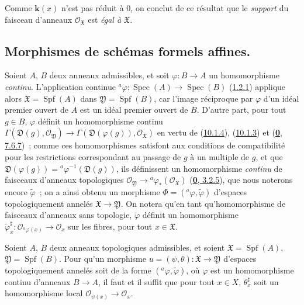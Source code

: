 Comme $\boldsymbol{k}(x)$ n'est pas réduit à 0, on conclut de ce résultat que le
\emph{support} du faisceau d'anneaux $\mathscr{O}_{\mathfrak{X}}$ est
\emph{égal à $\mathfrak{X}$}.

\subsection{Morphismes de schémas formels affines.}
\label{subsection:I.10.2-fr}

\begin{env}[10.2.1]
\label{I.10.2.1-fr}
Soient $A$, $B$ deux anneaux admissibles, et soit
$\varphi:B\to A$ un homomorphisme \emph{continu}. L'application continue
$ {}^a\varphi:\operatorname{Spec}(A)\to\operatorname{Spec}(B)$
(\hyperref[I.1.2.1-fr]{1.2.1}) applique alors
$\mathfrak{X}=\operatorname{Spf}(A)$ dans
$\mathfrak{Y}=\operatorname{Spf}(B)$, car l'image réciproque par
$\varphi$ d'un idéal premier ouvert de $A$ est un idéal premier ouvert de
$B$. D'autre part, pour tout $g\in B$, $\varphi$ définit un homomorphisme
continu
$\Gamma(\mathfrak{D}(g),\mathscr{O}_{\mathfrak{Y}})\to
\Gamma(\mathfrak{D}(\varphi(g)),\mathscr{O}_{\mathfrak{X}})$
en vertu de (\hyperref[I.10.1.4-fr]{10.1.4}),
(\hyperref[I.10.1.3-fr]{10.1.3}) et
(\hyperref[0.7.6.7-fr]{\textbf{0}, 7.6.7})~; comme ces homomorphismes satisfont aux
conditions de compatibilité pour les restrictions correspondant au
passage de $g$ à un multiple de $g$, et que
$\mathfrak{D}(\varphi(g))={}^a\varphi^{-1}(\mathfrak{D}(g))$, ils
définissent un homomorphisme \emph{continu} de faisceaux d'anneaux
topologiques
$\mathscr{O}_{\mathfrak{Y}}\to
{}^a\varphi_*(\mathscr{O}_{\mathfrak{X}})$
(\hyperref[0.3.2.5-fr]{\textbf{0}, 3.2.5}), que nous noterons encore
$\widetilde{\varphi}$~; on a ainsi obtenu un morphisme
$\Phi=({}^a\varphi,\widetilde{\varphi})$ d'espaces topologiquement annelés
$\mathfrak{X}\to\mathfrak{Y}$. On notera qu'en tant qu'homomorphisme de
faisceaux d'anneaux sans topologie, $\widetilde{\varphi}$ définit un
homomorphisme
$\widetilde{\varphi}_x^\sharp:
\mathscr{O}_{{}^a\varphi(x)}\to\mathscr{O}_x$ sur les fibres, pour tout
$x\in\mathfrak{X}$.
\end{env}

\begin{proposition}[10.2.2]
\label{I.10.2.2-fr}
Soient $A$, $B$ deux anneaux topologiques admissibles, et soient
$\mathfrak{X}=\operatorname{Spf}(A)$,
$\mathfrak{Y}=\operatorname{Spf}(B)$. Pour qu'un morphisme
$u=(\psi,\theta):\mathfrak{X}\to\mathfrak{Y}$ d'espaces topologiquement
annelés soit de la forme $({}^a\varphi,\widetilde{\varphi})$, où
$\varphi$ est un homomorphisme continu d'anneaux $B\to A$, il faut et il
suffit que pour tout $x\in X$,
$\theta_x^\sharp$ soit un homomorphisme local
$\mathscr{O}_{\psi(x)}\to\mathscr{O}_x$.
\end{proposition}

